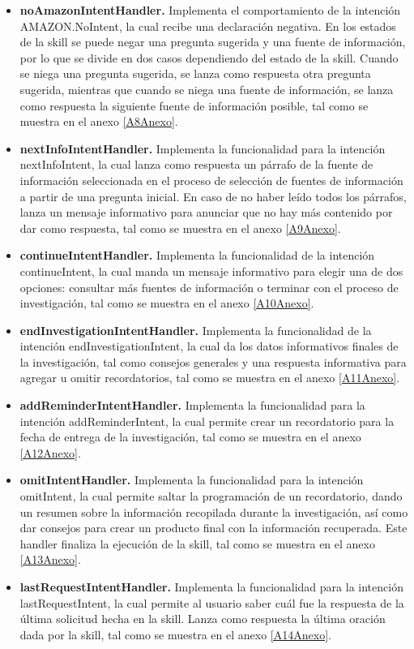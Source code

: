 \begin{itemize}
  \item \textbf{noAmazonIntentHandler.} Implementa el comportamiento de la intención AMAZON.NoIntent, la cual recibe una declaración negativa. En los estados de la skill se puede negar una pregunta sugerida y una fuente de información, por lo que se divide en dos casos dependiendo del estado de la skill. Cuando se niega una pregunta sugerida, se lanza como respuesta otra pregunta sugerida, mientras que cuando se niega una fuente de información, se lanza como respuesta la siguiente fuente de información posible, tal como se muestra en el anexo \ref{A8Anexo}.
  \item \textbf{nextInfoIntentHandler.} Implementa la funcionalidad para la intención nextInfoIntent, la cual lanza como respuesta un párrafo de la fuente de información seleccionada en el proceso de selección de fuentes de información a partir de una pregunta inicial. En caso de no haber leído todos los párrafos, lanza un mensaje informativo para anunciar que no hay más contenido por dar como respuesta, tal como se muestra en el anexo \ref{A9Anexo}.
  \item \textbf{continueIntentHandler.} Implementa la funcionalidad de la intención continueIntent, la cual manda un mensaje informativo para elegir una de dos opciones: consultar más fuentes de información o terminar con el proceso de investigación, tal como se muestra en el anexo \ref{A10Anexo}.
  \item \textbf{endInvestigationIntentHandler.} Implementa la funcionalidad de la intención endInvestigationIntent, la cual da los datos informativos finales de la investigación, tal como consejos generales y una respuesta informativa para agregar u omitir recordatorios, tal como se muestra en el anexo \ref{A11Anexo}.
  \item \textbf{addReminderIntentHandler.} Implementa la funcionalidad para la intención addReminderIntent, la cual permite crear un recordatorio para la fecha de entrega de la investigación, tal como se muestra en el anexo \ref{A12Anexo}.
  \item \textbf{omitIntentHandler.} Implementa la funcionalidad para la intención omitIntent, la cual permite saltar la programación de un recordatorio, dando un resumen sobre la información recopilada durante la investigación, así como dar consejos para crear un producto final con la información recuperada. Este handler finaliza la ejecución de la skill, tal como se muestra en el anexo \ref{A13Anexo}.
  \item \textbf{lastRequestIntentHandler.} Implementa la funcionalidad para la intención lastRequestIntent, la cual permite al usuario saber cuál fue la respuesta de la última solicitud hecha en la skill. Lanza como respuesta la última oración dada por la skill, tal como se muestra en el anexo \ref{A14Anexo}.
\end{itemize}

